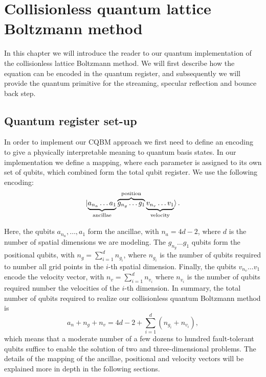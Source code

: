 \section{Collisionless quantum lattice Boltzmann method \label{sec:cqbm}}
In this chapter we will introduce the reader to our quantum implementation of the collisionless lattice Boltzmann method. We will first describe how the equation can be encoded in the quantum register, and subsequently we will provide the quantum primitive for the streaming, specular reflection and bounce back step. 

\subsection{Quantum register set-up}\label{sec:quantum register set-up}
In order to implement our CQBM approach we first need to define an encoding to give a physically interpretable meaning to quantum basis states. 
In our implementation we define a mapping, where each parameter is assigned to its own set of qubits, which combined form the total qubit register. 
We use the following encoding:
\begin{equation}
    \ket{\underbrace{a_{n_a}\dots a_{1}}_{\mathrm{ancillae}} \overbrace{ g_{n_g} \dots g_{1} }^{\mathrm{position}} \underbrace{ v_{n_v} \dots v_1}_{\mathrm{velocity}}}.
\end{equation}

Here, the qubits $a_{n_a}, \dots, a_1$ form the ancillae, with $n_a = 4d-2$, where $d$ is the number of spatial dimensions we are modeling. The $g_{n_g} \dots g_1$ qubits form the positional qubits, with $n_g = \sum_{i=1}^{d}n_{g_i}$, where $n_{g_i}$ is the number of qubits required to number all grid points in the $i$-th spatial dimension. Finally, the qubits $v_{n_v} \dots v_1$ encode the velocity vector, with $n_v = \sum_{i=1}^{d}n_{v_i} $ where $n_{v_i}$ is the number of qubits required number the velocities of the $i$-th dimension. In summary, the total number of qubits required to realize our collisionless quantum Boltzmann method is
\begin{equation}
    a_n + n_g + n_v = 4d-2 + \sum_{i=1}^d (n_{g_i}+n_{v_i}),
\end{equation}
which means that a moderate number of a few dozens to hundred fault-tolerant qubits suffice to enable the solution of two and three-dimensional problems.
The details of the mapping of the ancillae, positional and velocity vectors will be explained more in depth in the following sections. 


